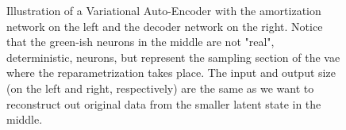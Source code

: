 		\begin{figure}
			\centering
			\tikzVariationalAutoEncoder
			\caption{Illustration of a Variational Auto-Encoder with the amortization network on the left and the decoder network on the right. Notice that the green-ish neurons in the middle are not "real", deterministic, neurons, but represent the sampling section of the \ac{vae} where the reparametrization takes place. The input and output size (on the left and right, respectively) are the same as we want to reconstruct out original data from the smaller latent state in the middle.}
			\label{fig:vae}
		\end{figure}
